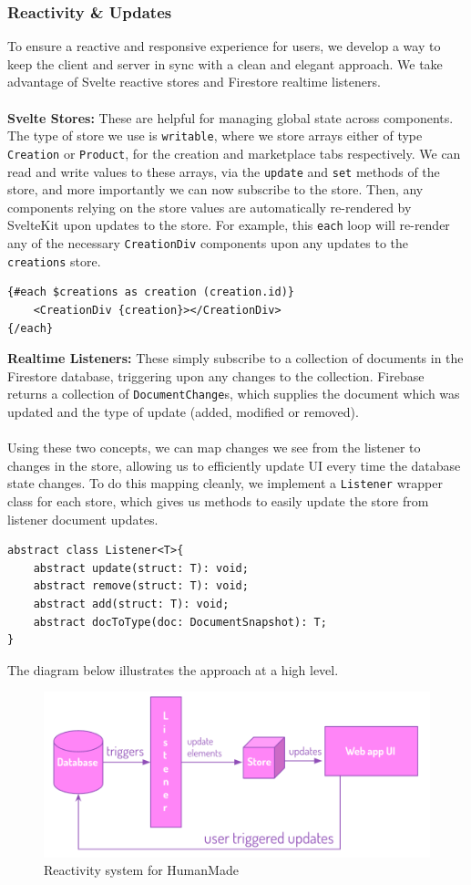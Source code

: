 \documentclass[12pt,a4paper]{article}
\begin{document}
\subsubsection{Reactivity \& Updates}
To ensure a reactive and responsive experience for users, we develop a way to keep the client and server in sync with a clean and elegant approach.
We take advantage of Svelte reactive stores and Firestore realtime listeners.\\\\
\textbf{Svelte Stores:} These are helpful for managing global state across components. The type of store we use is \verb|writable|, where we store arrays either of type \verb|Creation| or \verb|Product|, for the creation and marketplace tabs respectively. We can read and write values to these arrays, via the \verb|update| and \verb|set| methods of the store, and more importantly we can now subscribe to the store. Then, any components relying on the store values are automatically re-rendered by SvelteKit upon updates to the store. For example, this \verb|each| loop will re-render any of the necessary \verb|CreationDiv| components upon any updates to the \verb|creations| store.
\begin{lstlisting}
{#each $creations as creation (creation.id)}
    <CreationDiv {creation}></CreationDiv>
{/each}
\end{lstlisting}
\textbf{Realtime Listeners:} These simply subscribe to a collection of documents in the Firestore database, triggering upon any changes to the collection. Firebase returns a collection of \verb|DocumentChange|s, which supplies the document which was updated and the type of update (added, modified or removed).
\\\\
Using these two concepts, we can map changes we see from the listener to changes in the store, allowing us to efficiently update UI every time the database state changes. To do this mapping cleanly, we implement a \verb|Listener| wrapper class for each store, which gives us methods to easily update the store from listener document updates. 
\begin{lstlisting}
abstract class Listener<T>{
    abstract update(struct: T): void;
    abstract remove(struct: T): void;
    abstract add(struct: T): void;
    abstract docToType(doc: DocumentSnapshot): T;
}
\end{lstlisting}
\noindent
The diagram below illustrates the approach at a high level.
\begin{figure}[H]
    \centering
    \includegraphics[scale=0.8]{reactivity.png}
    \caption{Reactivity system for HumanMade\cite{gpt4}}
\end{figure}
\end{document}
